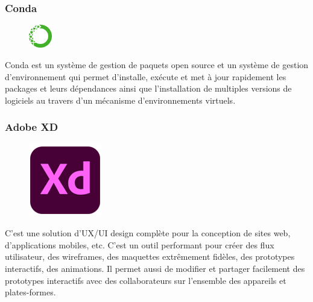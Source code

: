             
        \subsubsection*{Conda}
            \begin{figure}
                \vspace{-36pt}
              \begin{center}
                 \includegraphics[width=0.09\textwidth]{images/Conda logo.png}
                 \label{fig68}
              \end{center}
              \vspace{-20pt}
              \vspace{-10pt}
            \end{figure}
            Conda est un système de gestion de paquets open source et un système de gestion d’environnement qui permet d’installe, exécute et met à jour rapidement les packages et leurs dépendances ainsi que l’installation de multiples versions de logiciels au travers d’un mécanisme d’environnements virtuels\cite{44}.
            
        
        
        \subsubsection*{Adobe XD}
            \begin{figure}
                \vspace{-22pt}
              \begin{center}
                 \includegraphics[scale=0.36]{images/logo/adobexd.png}
                 \label{fig69}
              \end{center}
              \vspace{-20pt}
              \vspace{-10pt}
            \end{figure}
            C’est une solution d’UX/UI design complète pour la conception de sites web, d’applications mobiles, etc.
            C’est un outil performant pour créer des flux utilisateur, des wireframes, des maquettes extrêmement fidèles, des prototypes interactifs, des animations. Il permet aussi de modifier et partager facilement des prototypes interactifs avec des collaborateurs sur l’ensemble des appareils et plates-formes\cite{45}.

